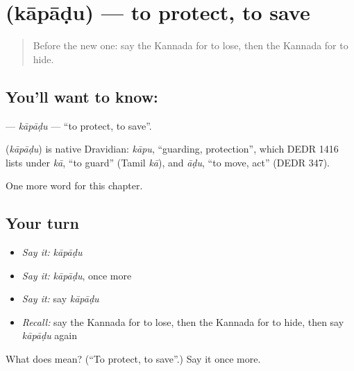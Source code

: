 \section[\texorpdfstring{\kn{ಕಾಪಾಡು} (kāpāḍu)}{ಕಾಪಾಡು (kāpāḍu)}]{ (kāpāḍu) — to protect, to save}

\label{lesson:KA-C151-kapadu}



\begin{quote}
Before the new one: say the Kannada for to lose, then the Kannada for to hide.
\end{quote}

\subsection*{You'll want to know: }
\textbf{} — \emph{kāpāḍu} — \textquotedblleft{}to protect, to save\textquotedblright{}.

\begin{cousinweb}
\textbf{} (\emph{kāpāḍu}) is native Dravidian: \emph{kāpu}, \textquotedblleft{}guarding, protection\textquotedblright{}, which DEDR 1416 lists under \emph{kā}, \textquotedblleft{}to guard\textquotedblright{} (Tamil \emph{kā}), and \emph{āḍu}, \textquotedblleft{}to move, act\textquotedblright{} (DEDR 347).
\end{cousinweb}

\begin{grammarlens}[title={What you've built}]
One more word for this chapter.
\end{grammarlens}

\subsection*{Your turn}
\begin{itemize}
\raggedright
  \item \emph{Say it:} \emph{kāpāḍu}
  \item \emph{Say it:} \emph{kāpāḍu}, once more
  \item \emph{Say it:} say \emph{kāpāḍu}
  \item \emph{Recall:} say the Kannada for to lose, then the Kannada for to hide, then say \emph{kāpāḍu} again
\end{itemize}

\begin{tcolorbox}[breakable,colback=teal!4,colframe=teal!35!black,title={Before you move on}]
What does  mean? (\textquotedblleft{}To protect, to save\textquotedblright{}.) Say it once more.
\end{tcolorbox}
